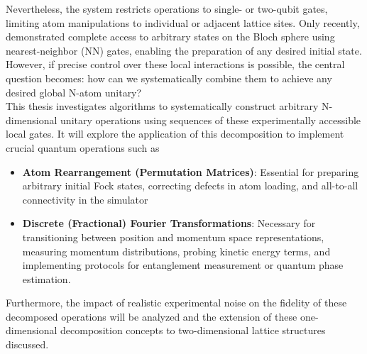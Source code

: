Nevertheless, the system restricts operations to single- or two-qubit gates, limiting atom manipulations to individual or adjacent lattice sites. Only recently, \cite{impertro2024local} demonstrated complete access to arbitrary states on the Bloch sphere using nearest-neighbor (NN) gates, enabling the preparation of any desired initial state. However, if precise control over these local interactions is possible, the central question becomes: how can we systematically combine them to achieve any desired global N-atom unitary? \\
This thesis investigates algorithms to systematically construct arbitrary N-dimensional unitary operations using sequences of these experimentally accessible local gates. It  will explore the application of this decomposition to implement crucial quantum operations such as 
\begin{itemize}
    \item \textbf{Atom Rearrangement (Permutation Matrices)}: Essential for preparing arbitrary initial Fock states, correcting defects in atom loading, and all-to-all connectivity in the simulator
    \item \textbf{Discrete (Fractional) Fourier Transformations}: Necessary for transitioning between position and momentum space representations, measuring momentum distributions, probing kinetic energy terms, and implementing protocols for entanglement measurement or quantum phase estimation.
\end{itemize}
Furthermore, the impact of realistic experimental noise on the fidelity of these decomposed operations will be analyzed and the extension of these one-dimensional decomposition concepts to two-dimensional lattice structures discussed.


